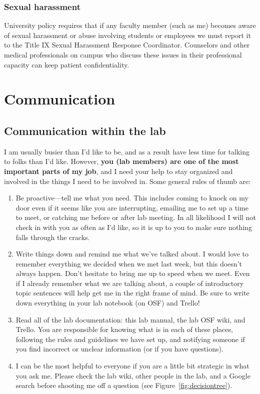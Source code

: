 \documentclass[letterpaper,12pt,oneside]{memoir}
\begin{document}
\subsection{Sexual harassment}
University policy requires that if any faculty member (such as me) becomes aware of sexual harassment or abuse involving students or employees we must report it to the Title IX Sexual Harassment Response Coordinator. Counselors and other medical professionals on campus who discuss these issues in their professional capacity can keep patient confidentiality.



\chapter{Communication}
\section{Communication within the lab}
\label{sec:communicationInLab}

I am usually busier than I'd like to be, and as a result have less time for talking to folks than I'd like. However, \textbf{you (lab members) are one of the most important parts of my job}, and I need your help to stay organized and involved in the things I need to be involved in. Some general rules of thumb are:

\begin{enumerate}
\item Be proactive---tell me what you need. This includes coming to knock on my door even if it seems like you are interrupting, emailing me to set up a time to meet, or catching me before or after lab meeting. In all likelihood I will not check in with you as often as I'd like, so it is up to you to make sure nothing falls through the cracks.

\item Write things down and remind me what we've talked about. I would love to remember everything we decided when we met last week, but this doesn't always happen. Don't hesitate to bring me up to speed when we meet. Even if I already remember what we are talking about, a couple of introductory topic sentences will help get me in the right frame of mind. Be sure to write down everything in your lab notebook (on OSF) and Trello!

\item Read all of the lab documentation: this lab manual, the lab OSF wiki, and Trello. You are responsible for knowing what is in each of these places, following the rules and guidelines we have set up, and notifying someone if you find incorrect or unclear information (or if you have questions).

\item I can be the most helpful to everyone if you are a little bit strategic in what you ask me. Please check the lab wiki, other people in the lab, and a Google search before shooting me off a question (see Figure~\ref{fig:decisiontree}).

\end{enumerate}
\end{document}
